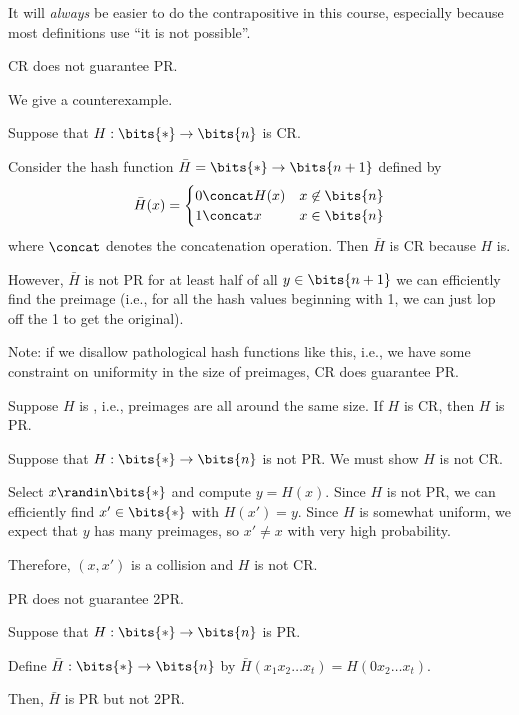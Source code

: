 \documentclass[class=co487,tikz,minted,notes]{agony}
\begin{document}
It will \emph{always} be easier to do the contrapositive in this course,
especially because most definitions use ``it is not possible''.

\begin{prop}
  CR does not guarantee PR.
\end{prop}
\begin{prf}
  We give a counterexample.

  Suppose that $H : \bits{*} \to \bits{n}$ is CR.

  Consider the hash function $\bar H = \bits{*} \to \bits{n+1}$ defined by
  \[
    \bar H(x) = \begin{cases}
      0 \concat H(x) & x \not\in \bits{n} \\
      1 \concat x    & x \in \bits{n}
    \end{cases}
  \]
  where $\concat$ denotes the concatenation operation. Then $\bar H$ is CR because $H$ is.

  However, $\bar H$ is not PR for at least half of all $y \in \bits{n+1}$
  we can efficiently find the preimage (i.e., for all the hash values beginning with 1,
  we can just lop off the 1 to get the original).
\end{prf}

Note: if we disallow pathological hash functions like this, i.e.,
we have some constraint on uniformity in the size of preimages,
CR does guarantee PR.

\begin{prop}
  Suppose $H$ is , i.e., preimages are all around the same size.
  If $H$ is CR, then $H$ is PR.
\end{prop}
\begin{prf}
  Suppose that $H : \bits{*} \to \bits{n}$ is not PR.
  We must show $H$ is not CR.

  Select $x \randin \bits{*}$ and compute $y = H(x)$.
  Since $H$ is not PR, we can efficiently find $x' \in \bits{*}$ with $H(x') = y$.
  Since $H$ is somewhat uniform, we expect that $y$ has many preimages,
  so $x' \neq x$ with very high probability.

  Therefore, $(x,x')$ is a collision and $H$ is not CR.
\end{prf}

\begin{prop}
  PR does not guarantee 2PR.
\end{prop}
\begin{prf}
  Suppose that $H : \bits{*} \to \bits{n}$ is PR.

  Define $\bar H : \bits{*} \to \bits{n}$ by $\bar H(x_1x_2\dots x_t) = H(0x_2\dots x_t)$.

  Then, $\bar H$ is PR but not 2PR.
\end{prf}
\end{document}
